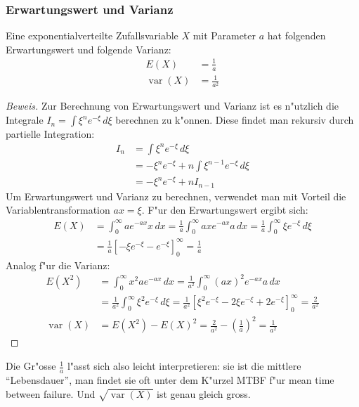 \subsubsection{Erwartungswert und Varianz}
\begin{satz}Eine exponentialverteilte Zufallsvariable $X$ mit Parameter
$a$ hat folgenden Erwartungswert und folgende Varianz:
\begin{align*}
E(X)&=\frac1a\\
\operatorname{var}(X)&=\frac1{a^2}
\end{align*}
\end{satz}
\begin{proof}[Beweis]
Zur Berechnung von Erwartungswert und Varianz ist es n"utzlich die Integrale
$I_n=\int \xi^ne^{-\xi}\,d\xi$
berechnen zu k"onnen.
Diese findet man rekursiv durch partielle Integration:
\begin{align*}
I_n&=\int \xi^ne^{-\xi}\,d\xi\\
&=-\xi^ne^{-\xi}+n\int \xi^{n-1}e^{-\xi}\,d\xi\\
&=-\xi^ne^{-\xi}+nI_{n-1}
\end{align*}
Um Erwartungswert und Varianz zu berechnen, verwendet man mit Vorteil die
Variablentransformation $ax=\xi$.
F"ur den Erwartungswert ergibt sich:
\begin{align*}
E(X)&=\int_0^{\infty}ae^{-ax}x\,dx
=\frac1a\int_0^{\infty}ax e^{-ax}a\,dx
=\frac1a\int_0^{\infty}\xi e^{-\xi}\,d\xi\\
&=\frac1a\left[-\xi e^{-\xi}-e^{-\xi}\right]_0^\infty=\frac1a
\end{align*}
Analog f"ur die Varianz:
\begin{align*}
E(X^2)
&=
\int_0^{\infty}x^2ae^{-ax}\,dx
=\frac1{a^2}\int_0^{\infty}(ax)^2e^{-ax}a\,dx\\
&=\frac1{a^2}\int_0^{\infty}\xi^2e^{-\xi}\,d\xi
=\frac1{a^2}\left[\xi^2e^{-\xi}-2\xi e^{-\xi}+2e^{-\xi}\right]_0^\infty
=\frac2{a^2}
\\
\operatorname{var}(X)
&=E(X^2)-E(X)^2=\frac2{a^2}-\left(\frac1a\right)^2=\frac1{a^2}
\end{align*}
\end{proof}
Die Gr"osse $\frac1a$ l"asst sich also leicht interpretieren: sie ist die
mittlere ``Lebensdauer'', man findet sie oft unter dem K"urzel MTBF f"ur
mean time between failure.
Und $\sqrt{\operatorname{var}(X)}$ 
ist genau gleich gross. 
